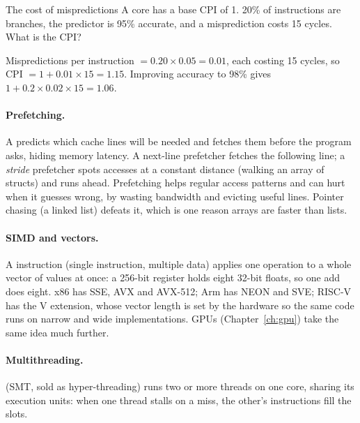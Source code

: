 \begin{worked}{The cost of mispredictions}
A core has a base CPI of 1. 20\% of instructions are branches, the predictor is 95\% accurate, and a misprediction costs 15 cycles. What is the CPI?

Mispredictions per instruction $= 0.20 \times 0.05 = 0.01$, each costing 15 cycles, so CPI $= 1 + 0.01 \times 15 = 1.15$. Improving accuracy to 98\% gives $1 + 0.2 \times 0.02 \times 15 = 1.06$.
\end{worked}

\paragraph{Prefetching.} A  predicts which cache lines will be needed and fetches them before the program asks, hiding memory latency. A next-line prefetcher fetches the following line; a \emph{stride} prefetcher spots accesses at a constant distance (walking an array of structs) and runs ahead. Prefetching helps regular access patterns and can hurt when it guesses wrong, by wasting bandwidth and evicting useful lines. Pointer chasing (a linked list) defeats it, which is one reason arrays are faster than lists.

\paragraph{SIMD and vectors.} A  instruction (single instruction, multiple data) applies one operation to a whole vector of values at once: a 256-bit register holds eight 32-bit floats, so one add does eight. x86 has SSE, AVX and AVX-512; Arm has NEON and SVE; RISC-V has the V extension, whose vector length is set by the hardware so the same code runs on narrow and wide implementations. GPUs (Chapter~\ref{ch:gpu}) take the same idea much further.

\paragraph{Multithreading.}  (SMT, sold as hyper-threading) runs two or more threads on one core, sharing its execution units: when one thread stalls on a miss, the other's instructions fill the slots.

